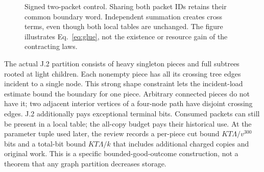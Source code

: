 \documentclass[11pt,letterpaper]{article}
\theoremstyle{definition}\newtheorem{definition}[theorem]{Definition}\newtheorem{example}[theorem]{Example}
\theoremstyle{remark}\newtheorem{remark}[theorem]{Remark}
\begin{document}
\begin{figure}[!htbp]
\centering
{}
\caption{Signed two-packet control. Sharing both packet IDs retains their common boundary word. Independent summation creates cross terms, even though both local tables are unchanged. The figure illustrates Eq.~\eqref{eq:glue}, not the existence or resource gain of the contracting laws.}\label{fig:shared-boundary}
\end{figure}

The actual J.2 partition consists of heavy singleton pieces and full subtrees rooted at light children. Each nonempty piece has all its crossing tree edges incident to a single node. This strong shape constraint lets the incident-load estimate bound the boundary for one piece. Arbitrary connected pieces do not have it; two adjacent interior vertices of a four-node path have disjoint crossing edges. J.2 additionally pays exceptional terminal bits. Consumed packets can still be present in a local table; the all-copy budget pays their historical use. At the parameter tuple used later, the review records a per-piece cut bound $KT\Lambda/v^{300}$ bits and a total-bit bound $KT\Lambda/k$ that includes additional charged copies and original work. This is a specific bounded-good-outcome construction, not a theorem that any graph partition decreases storage.
\end{document}
